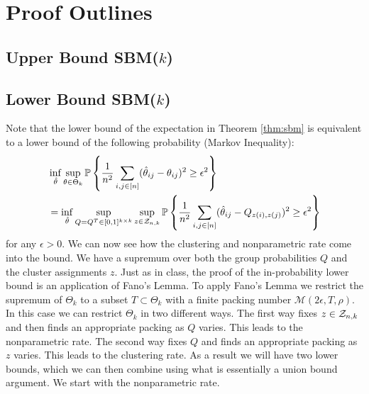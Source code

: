 \documentclass[11pt]{article}
\begin{document}
\section{Proof Outlines}\label{sec:proofs}

\subsection{Upper Bound SBM($k$)} \label{sec:upper_sbm}



\subsection{Lower Bound SBM($k$)} \label{sec:lower_sbm}
Note that the lower bound of the expectation in Theorem \ref{thm:sbm} is equivalent to a lower bound of the following probability (Markov Inequality):
\begin{equation}
\begin{aligned}
&\inf_{\hat{\theta}} \sup_{\theta \in \Theta_k} \mathbb{P} \left\{ \frac{1}{n^2}\sum_{i,j \in \lbrack n\rbrack} (\hat{\theta}_{ij} - \theta_{ij})^2 \geq \epsilon^2\right\}  \\
&= \inf_{\hat{\theta}} \sup_{Q = Q^T \in [0, 1]^{k \times k}} \sup_{z \in \mathcal{Z}_{n,k}} \mathbb{P} \left\{ \frac{1}{n^2}\sum_{i,j \in \lbrack n\rbrack} (\hat{\theta}_{ij} - Q_{z(i), z(j)})^2 \geq \epsilon^2\right\}
\end{aligned}
\end{equation}
for any $\epsilon > 0$. We can now see how the clustering and nonparametric rate come into the bound. We have a supremum over both the group probabilities $Q$ and the cluster assignments $z$. Just as in class, the proof of the in-probability lower bound is an application of Fano's Lemma. To apply Fano's Lemma we restrict the supremum of $\Theta_k$ to a subset $T \subset \Theta_k$ with a finite packing number $\mathcal{M}(2 \epsilon, T, \rho)$. In this case we can restrict $\Theta_k$ in two different ways. The first way fixes $z \in \mathcal{Z}_{n,k}$ and then finds an appropriate packing as $Q$ varies. This leads to the nonparametric rate. The second way fixes $Q$ and finds an appropriate packing as $z$ varies. This leads to the clustering rate. As a result we will have two lower bounds, which we can then combine using what is essentially a union bound argument. We start with the nonparametric rate.
\end{document}
